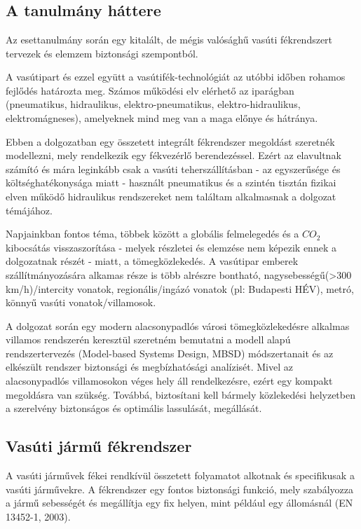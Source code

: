 \chapter{\caseStudy} \label{chap:cs}

\section{A tanulmány háttere}
Az esettanulmány során egy kitalált, de mégis valósághű vasúti fékrendszert tervezek és elemzem biztonsági szempontból.

A vasútipart és ezzel együtt a vasútifék-technológiát az utóbbi időben rohamos fejlődés határozta meg. 
Számos működési elv elérhető az iparágban (pneumatikus, hidraulikus, elektro-pneumatikus, elektro-hidraulikus, elektromágneses), amelyeknek mind meg van a maga előnye és hátránya.

Ebben a dolgozatban egy összetett integrált fékrendszer megoldást szeretnék modellezni, mely rendelkezik egy fékvezérlő berendezéssel.
Ezért az elavultnak számító és mára leginkább csak a vasúti teherszállításban - az egyszerűsége és költséghatékonysága miatt - használt pneumatikus és a szintén tisztán fizikai elven működő hidraulikus rendszereket nem találtam alkalmasnak a dolgozat témájához.

Napjainkban fontos téma, többek között a globális felmelegedés és a ${CO}_2$ kibocsátás visszaszorítása - melyek részletei és elemzése nem képezik ennek a dolgozatnak részét - miatt, a tömegközlekedés.
A vasútipar emberek szállítmányozására alkamas része is több alrészre bontható, nagysebességű(>300 km/h)/intercity vonatok, 
regionális/ingázó vonatok (pl: Budapesti HÉV), metró, könnyű vasúti vonatok/villamosok.

A dolgozat során egy modern alacsonypadlós városi tömegközlekedésre alkalmas villamos rendszerén keresztül szeretném bemutatni a modell alapú rendszertervezés (Model-based Systems Design, MBSD) módszertanait és az elkészült rendszer biztonsági és megbízhatósági analízisét. 
Mivel az alacsonypadlós villamosokon véges hely áll rendelkezésre, ezért egy kompakt megoldásra van szükség. 
Továbbá, biztosítani kell bármely közlekedési helyzetben a szerelvény biztonságos és optimális lassulását, megállását.

\section{Vasúti jármű fékrendszer} \label{sec:vjfr}
A vasúti járművek fékei rendkívül összetett folyamatot alkotnak és specifikusak a vasúti járművekre.
A fékrendszer egy fontos biztonsági funkció, mely szabályozza a jármű sebességét és megállítja egy fix helyen, mint például egy állomásnál (EN 13452-1, 2003).

